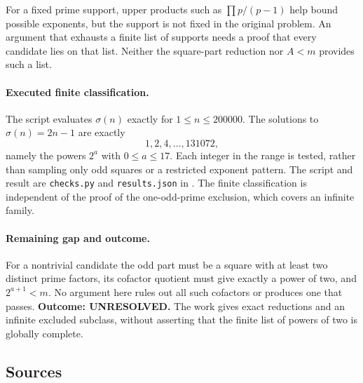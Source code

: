 \documentclass[11pt,a4paper]{article}
\begin{document}
For a fixed prime support, upper products such as
$\prod p/(p-1)$ help bound possible exponents, but the support is not
fixed in the original problem. An argument that exhausts a finite list
of supports needs a proof that every candidate lies on that list.
Neither the square-part reduction nor $A<m$ provides such a list.

\paragraph{Executed finite classification.}
The script evaluates $\sigma(n)$ exactly for $1\le n\le200000$.
The solutions to $\sigma(n)=2n-1$ are exactly
\[
                    1,2,4,\ldots,131072,
\]
namely the powers $2^a$ with $0\le a\le17$. Each integer in the
range is tested, rather than sampling only odd squares or a restricted
exponent pattern. The script and result are \texttt{checks.py} and
\texttt{results.json} in
.
The finite classification is independent of the proof of the
one-odd-prime exclusion, which covers an infinite family.

\paragraph{Remaining gap and outcome.}
For a nontrivial candidate the odd part must be a square with at least
two distinct prime factors, its cofactor quotient must give exactly a
power of two, and $2^{a+1}<m$. No argument here rules out all such
cofactors or produces one that passes. \textbf{Outcome: UNRESOLVED.}
The work gives exact reductions and an infinite excluded subclass,
without asserting that the finite list of powers of two is globally
complete.

\subsection{Sources}
\end{document}
